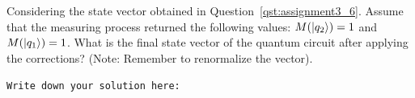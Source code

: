 \begin{question}
Considering the state vector obtained in Question~\ref{qst:assignment3_6}. Assume that the measuring process returned the following values: $M(\ket{q_{2}}) = 1$ and $M(\ket{q_{1}}) = 1$. What is the final state vector of the quantum circuit after applying the corrections? (Note: Remember to renormalize the vector).
\label{qst:assignment3_10}
\end{question}
{\small
\texttt{Write down your solution here:}
\begin{equation*}
  \begin{split}
  \end{split}
\end{equation*}}
